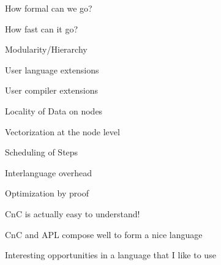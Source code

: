 How formal can we go?

How fast can it go?

Modularity/Hierarchy

User language extensions

User compiler extensions

\newslide


Locality of Data on nodes

Vectorization at the node level

Scheduling of Steps

Interlanguage overhead

Optimization by proof

\newslide


CnC is actually easy to understand!

CnC and APL compose well to form a nice language

Interesting opportunities in a language that I like to use

\newslide


\bye
